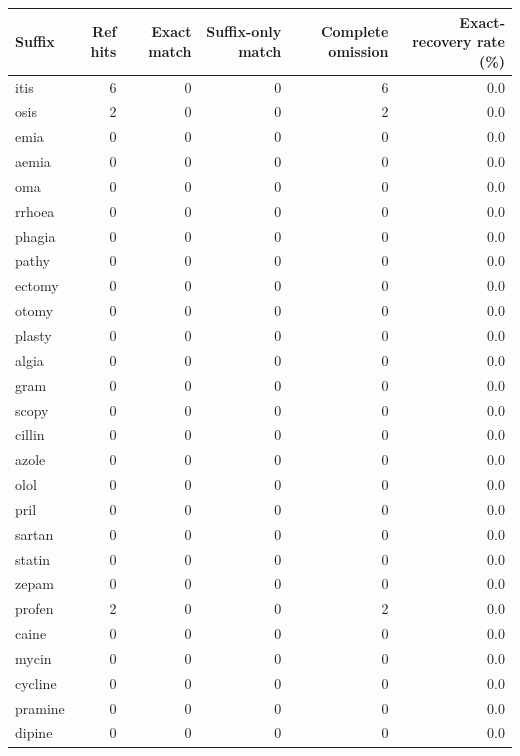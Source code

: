 \begin{tabular}{lrrrrr}
\toprule
Suffix & Ref hits & Exact match & Suffix-only match & Complete omission & Exact-recovery rate (\%) \\
\midrule
itis & 6 & 0 & 0 & 6 & 0.0 \\
osis & 2 & 0 & 0 & 2 & 0.0 \\
emia & 0 & 0 & 0 & 0 & 0.0 \\
aemia & 0 & 0 & 0 & 0 & 0.0 \\
oma & 0 & 0 & 0 & 0 & 0.0 \\
rrhoea & 0 & 0 & 0 & 0 & 0.0 \\
phagia & 0 & 0 & 0 & 0 & 0.0 \\
pathy & 0 & 0 & 0 & 0 & 0.0 \\
ectomy & 0 & 0 & 0 & 0 & 0.0 \\
otomy & 0 & 0 & 0 & 0 & 0.0 \\
plasty & 0 & 0 & 0 & 0 & 0.0 \\
algia & 0 & 0 & 0 & 0 & 0.0 \\
gram & 0 & 0 & 0 & 0 & 0.0 \\
scopy & 0 & 0 & 0 & 0 & 0.0 \\
cillin & 0 & 0 & 0 & 0 & 0.0 \\
azole & 0 & 0 & 0 & 0 & 0.0 \\
olol & 0 & 0 & 0 & 0 & 0.0 \\
pril & 0 & 0 & 0 & 0 & 0.0 \\
sartan & 0 & 0 & 0 & 0 & 0.0 \\
statin & 0 & 0 & 0 & 0 & 0.0 \\
zepam & 0 & 0 & 0 & 0 & 0.0 \\
profen & 2 & 0 & 0 & 2 & 0.0 \\
caine & 0 & 0 & 0 & 0 & 0.0 \\
mycin & 0 & 0 & 0 & 0 & 0.0 \\
cycline & 0 & 0 & 0 & 0 & 0.0 \\
pramine & 0 & 0 & 0 & 0 & 0.0 \\
dipine & 0 & 0 & 0 & 0 & 0.0 \\
\bottomrule
\end{tabular}
